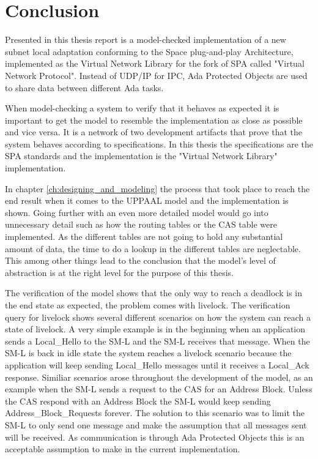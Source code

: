 \chapter{Conclusion}\label{ch:conclusion}
Presented in this thesis report is a model-checked implementation of a new
subnet local adaptation conforming to the Space plug-and-play Architecture,
implemented as the Virtual Network Library \cite{web:github-vn-lib} for the
fork of SPA called "Virtual Network Protocol". Instead of UDP/IP for IPC, Ada
Protected Objects are used to share data between different Ada tasks.

When model-checking a system to verify that it behaves as expected it is
important to get the model to resemble the implementation as close as possible
and vice versa. It is a network of two development artifacts that prove that the
system behaves according to specifications. In this thesis the specifications
are the SPA standards and the implementation is the "Virtual Network Library"
implementation.

In chapter \ref{ch:designing_and_modeling} the process that took place to reach
the end result when it comes to the UPPAAL model and the implementation is
shown. Going further with an even more detailed model would go into
unnecessary detail such as how the routing tables or the CAS table were
implemented. As the different tables are not going to hold any substantial
amount of data, the time to do a lookup in the different tables are
neglectable. This among other things lead to the conclusion that the model's
level of abstraction is at the right level for the purpose of this thesis.

The verification of the model shows that the only way to reach a deadlock is in
the end state as expected, the problem comes with livelock. The
verification query for livelock shows several different scenarios on how the
system can reach a state of livelock. A very simple example is in the beginning
when an application sends a Local\_Hello to the SM-L and the SM-L receives that
message. When the SM-L is back in idle state the system reaches a livelock
scenario because the application will keep sending Local\_Hello messages
until it receives a Local\_Ack response. Similiar scenarios arose throughout
the development of the model, as an example when the SM-L sends a request to
the CAS for an Address Block. Unless the CAS respond with an Address Block the
SM-L would keep sending Address\_Block\_Requests forever. The solution to this
scenario was to limit the SM-L to only send one message and make the
assumption that all messages sent will be received. As communication is through
Ada Protected Objects this is an acceptable assumption to make in the current
implementation.

